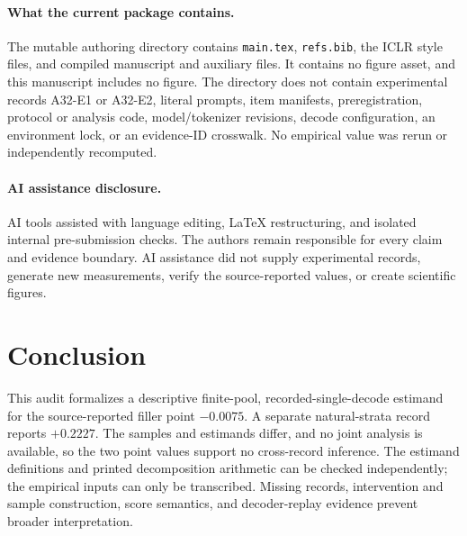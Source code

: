 \documentclass{article}
\begin{document}
\paragraph{What the current package contains.}
The mutable authoring directory contains \texttt{main.tex}, \texttt{refs.bib}, the ICLR
style files, and compiled manuscript and auxiliary files.  It contains no figure asset,
and this manuscript includes no figure.  The directory does not contain experimental
records A32-E1 or A32-E2, literal prompts, item manifests, preregistration, protocol or
analysis code, model/tokenizer revisions, decode configuration, an environment lock, or
an evidence-ID crosswalk.  No empirical value was rerun or independently recomputed.

\paragraph{AI assistance disclosure.}
AI tools assisted with language editing, \LaTeX{} restructuring, and isolated internal
pre-submission checks.  The authors remain responsible for every claim and evidence
boundary.  AI assistance did not supply experimental records, generate new
measurements, verify the source-reported values, or create scientific figures.

\section{Conclusion}
\label{sec:conclusion}

This audit formalizes a descriptive finite-pool, recorded-single-decode estimand for the
source-reported filler point $-0.0075$.  A separate natural-strata record reports
$+0.2227$.  The samples and estimands differ, and no joint analysis is available, so
the two point values support no cross-record inference.  The estimand definitions and
printed decomposition arithmetic can be checked independently; the empirical inputs
can only be transcribed.  Missing records, intervention and sample construction, score
semantics, and decoder-replay evidence prevent broader interpretation.

\begingroup
\fontsize{8}{8.8}\selectfont
\setlength{\bibsep}{0pt}


\endgroup
\end{document}
